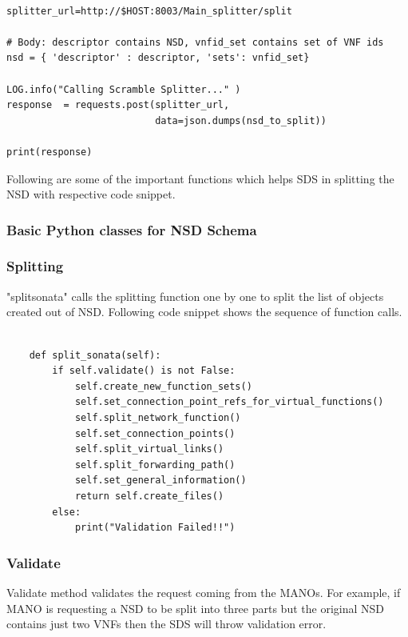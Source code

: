 \begin{lstlisting}[caption=POST call to SDS, label=lis:postSDS]

splitter_url=http://$HOST:8003/Main_splitter/split

# Body: descriptor contains NSD, vnfid_set contains set of VNF ids
nsd = { 'descriptor' : descriptor, 'sets': vnfid_set}

LOG.info("Calling Scramble Splitter..." )
response  = requests.post(splitter_url,
                          data=json.dumps(nsd_to_split))

print(response)

\end{lstlisting}

Following are some of the important functions which helps SDS in splitting the NSD with respective code snippet.

\subsubsection{Basic Python classes for NSD Schema}
\subsubsection{Splitting} "splitsonata" calls the splitting function one by one to split the list of objects created out of NSD. Following code snippet shows the sequence of function calls.

\begin{lstlisting}[caption=Sequence of function calls, label=lis:functioncalls]

    def split_sonata(self):
        if self.validate() is not False:
            self.create_new_function_sets()
            self.set_connection_point_refs_for_virtual_functions()
            self.split_network_function()
            self.set_connection_points()
            self.split_virtual_links()
            self.split_forwarding_path()
            self.set_general_information()
            return self.create_files()
        else:
            print("Validation Failed!!")

\end{lstlisting}

\subsubsection{Validate} Validate method validates the request coming from the MANOs. For example, if MANO is requesting a NSD to be split into three parts but the original NSD contains just two VNFs then the SDS will throw validation error.

